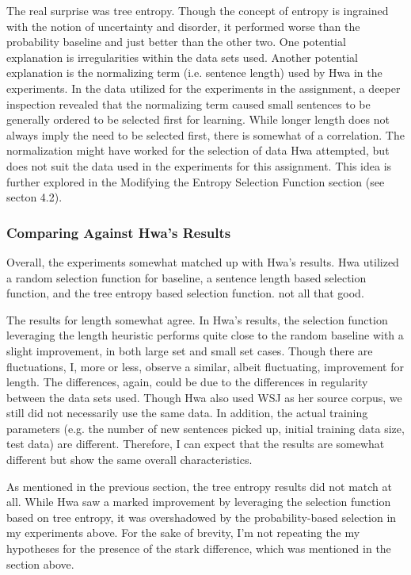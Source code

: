 \documentclass{article} %
\begin{document}
The real surprise was tree entropy. Though the concept of entropy is ingrained with the notion of uncertainty and disorder, it performed worse than the probability baseline and just better than the other two. One potential explanation is irregularities within the data sets used. Another potential explanation is the normalizing term (i.e. sentence length) used by Hwa in the experiments. In the data utilized for the experiments in the assignment, a deeper inspection revealed that the normalizing term caused small sentences to be generally ordered to be selected first for learning. While longer length does not always imply the need to be selected first, there is somewhat of a correlation. The normalization might have worked for the selection of data Hwa attempted, but does not suit the data used in the experiments for this assignment. This idea is further explored in the Modifying the Entropy Selection Function section (see secton 4.2).

\subsubsection{Comparing Against Hwa's Results}

Overall, the experiments somewhat matched up with Hwa's results. Hwa utilized a random selection function for baseline, a sentence length based selection function, and the tree entropy based selection function. not all that good.

The results for length somewhat agree. In Hwa's results, the selection function leveraging the length heuristic performs quite close to the random baseline with a slight improvement, in both large set and small set cases. Though there are fluctuations, I, more or less, observe a similar, albeit fluctuating, improvement for length. The differences, again, could be due to the differences in regularity between the data sets used. Though Hwa also used WSJ as her source corpus, we still did not necessarily use the same data. In addition, the actual training parameters (e.g. the number of new sentences picked up, initial training data size, test data) are different. Therefore, I can expect that the results are somewhat different but show the same overall characteristics.

As mentioned in the previous section, the tree entropy results did not match at all. While Hwa saw a marked improvement by leveraging the selection function based on tree entropy, it was overshadowed by the probability-based selection in my experiments above. For the sake of brevity, I'm not repeating the my hypotheses for the presence of the stark difference, which was mentioned in the section above. 
\end{document}

